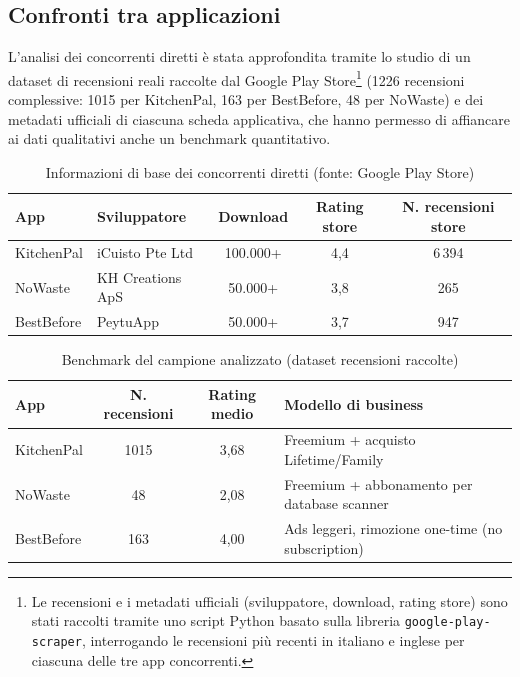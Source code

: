 \documentclass[11pt,a4paper]{article}
\begin{document}
\subsection{Confronti tra applicazioni}
L'analisi dei concorrenti diretti è stata approfondita tramite lo studio di un dataset di recensioni reali raccolte dal Google Play Store\footnote{Le recensioni e i metadati ufficiali (sviluppatore, download, rating store) sono stati raccolti tramite uno script Python basato sulla libreria \texttt{google-play-scraper}, interrogando le recensioni più recenti in italiano e inglese per ciascuna delle tre app concorrenti.} (1226 recensioni complessive: 1015 per KitchenPal, 163 per BestBefore, 48 per NoWaste) e dei metadati ufficiali di ciascuna scheda applicativa, che hanno permesso di affiancare ai dati qualitativi anche un benchmark quantitativo.

\begin{table}[H]
\centering
\caption{Informazioni di base dei concorrenti diretti (fonte: Google Play Store)}
\small
\begin{tabularx}{\textwidth}{lXccc}
\toprule
\textbf{App} & \textbf{Sviluppatore} & \textbf{Download} & \textbf{Rating store} & \textbf{N. recensioni store} \\
\midrule
KitchenPal  & iCuisto Pte Ltd   & 100.000+ & 4,4 & 6\,394 \\
NoWaste     & KH Creations ApS  & 50.000+  & 3,8 & 265   \\
BestBefore  & PeytuApp          & 50.000+  & 3,7 & 947   \\
\bottomrule
\end{tabularx}
\end{table}

\begin{table}[H]
\centering
\caption{Benchmark del campione analizzato (dataset recensioni raccolte)}
\small
\begin{tabular}{lccl}
\toprule
\textbf{App} & \textbf{N. recensioni} & \textbf{Rating medio} & \textbf{Modello di business} \\
\midrule
KitchenPal  & 1015 & 3,68 & Freemium + acquisto Lifetime/Family \\
NoWaste     & 48   & 2,08 & Freemium + abbonamento per database scanner \\
BestBefore  & 163  & 4,00 & Ads leggeri, rimozione one-time (no subscription) \\
\bottomrule
\end{tabular}
\end{table}
\end{document}
